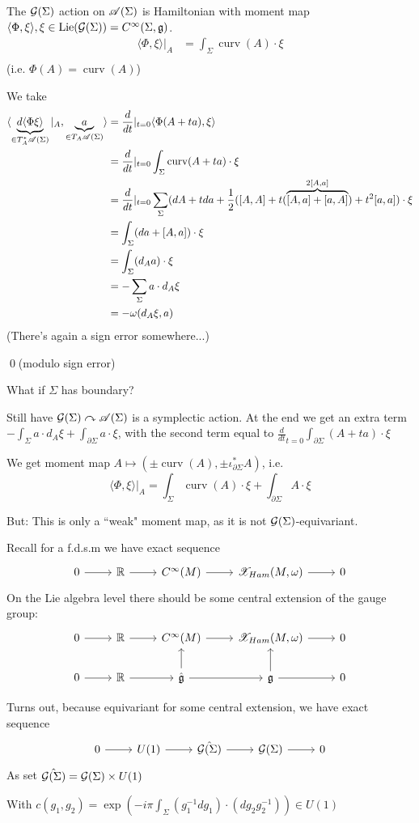 \documentclass[x11names,reqno,14pt]{extarticle}
\newcommand{\mk}[1]{\mathfrak{#1}}
\newcommand{\g}{\mk{g}}
\newcommand{\dd}[2]{\frac{d#1}{d#2}}
\begin{document}
The $\mathcal{G}(\Sigma)$ action on $\mathscr{A}(\Sigma)$ is Hamiltonian with moment map $\langle\Phi,\xi\rangle, \xi \in \operatorname{Lie}(\mc{G}(\Sigma)) = C^\oo(\Sigma,\g)$. 
\begin{align*}
\langle\Phi,\xi\rangle|_A & = \int_{\Sigma}\operatorname{curv}(A)\cdot\xi \\
\end{align*}
(i.e. $\Phi(A) = \operatorname{curv}(A)$)

\proof

We take 
\begin{align*}
\langle \underbrace{d\langle\Phi\xi\rangle}_{\in T_A^*\ms{A}(\Sigma)}|_A, \underbrace{a}_{\in T_A\ms{A}(\Sigma)}\rangle & = \dd{}{t}|_{t=0}\langle\Phi(A + ta),\xi\rangle \\
& = \dd{}{t}|_{t=0}\int_{\Sigma}\operatorname{curv}(A + ta)\cdot\xi \\
& = \dd{}{t}|_{t=0}\sum_{\Sigma}(dA + tda+ \frac12([A,A] + t(\overbrace{[A,a] + [a,A]}^{2[A,a]}) + t^2[a,a])\cdot\xi\\
& = \int_{\Sigma}(da + [A,a])\cdot\xi \\
& = \int_{\Sigma}(d_Aa)\cdot\xi \\
& = -\sum_{\Sigma}a\cdot d_A\xi \\
& = -\omega(d_A\xi,a) 
\end{align*}
(There's again a sign error somewhere...)

\qed(modulo sign error)


What if $\Sigma$ has boundary?

Still have $\mathcal{G}(\Sigma)\curvearrowright\mathscr{A}(\Sigma)$ is a symplectic action. At the end we get an extra term $-\int_{\Sigma}a\cdot d_A\xi + \int_{\partial\Sigma}a\cdot\xi$, with the second term equal to $\dd{}{t}_{t=0}\int_{\partial\Sigma}(A + ta)\cdot\xi$

We get moment map $A \mapsto (\pm\operatorname{curv}(A), \pm\iota_{\partial\Sigma}^*A)$, i.e. 
\[
\langle\Phi,\xi\rangle|_A = \int_{\Sigma}\operatorname{curv}(A)\cdot\xi + \int_{\partial\Sigma}A\cdot\xi
\]

But: This is only a ``weak" moment map, as it is not $\mathcal{G}(\Sigma)$-equivariant.

Recall for a f.d.s.m we have exact sequence
\[
\exactshort{\R}{}{C^\oo(M)}{}{\ms{X}_{Ham}(M,\omega)}
\]
On the Lie algebra level there should be some central extension of the gauge group:
\[
\begin{tikzcd}
0 \ar[r] &\R\ar[r] & C^\oo(M) \ar[r] & \ms{X}_{Ham}(M,\omega) \ar[r] & 0 \\
0 \ar[r] & \R \ar[r] & \hat{\g} \ar[u] \ar[r] & \g \ar[r]\ar[u] & 0
\end{tikzcd}
\]

Turns out, because equivariant for some central extension, we have exact sequence
\[
\exactshort{U(1)}{}{\hat{\mc{G}(\Sigma)}}{}{\mc{G}(\Sigma)}
\]
As set $\hat{\mathcal{G}(\Sigma)} = \mathcal{G}(\Sigma)\times U(1)$

With $c(g_1,g_2) = \exp(-i\pi\int_{\Sigma}(g_1^{-1}dg_1)\cdot(dg_2g_2^{-1}))\in U(1)$
\end{document}
